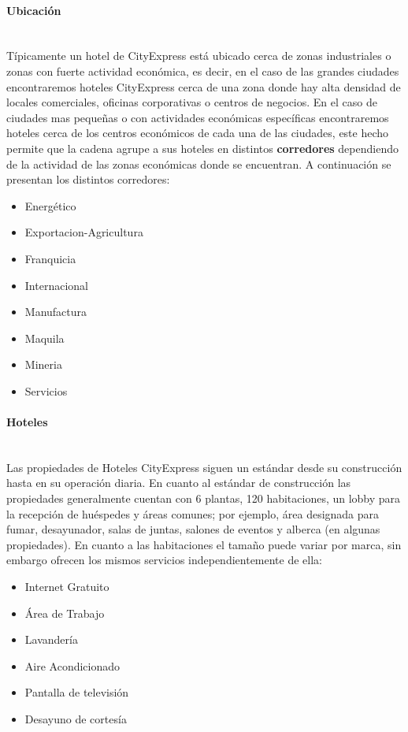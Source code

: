 \documentclass{article}\usepackage[]{graphicx}\usepackage[]{color}
\begin{document}
\paragraph {Ubicación} ~ \\
Típicamente un hotel de CityExpress está ubicado cerca de zonas industriales o zonas con fuerte actividad económica, es decir, en el caso de las grandes ciudades encontraremos hoteles CityExpress cerca de una zona donde hay alta densidad de locales comerciales, oficinas corporativas o centros de negocios. En el caso de ciudades mas pequeñas o con actividades económicas específicas encontraremos hoteles cerca de los centros económicos de cada una de las ciudades, este hecho permite que la cadena agrupe a sus hoteles en distintos \textbf{corredores} dependiendo de la actividad de las zonas económicas donde se encuentran. A continuación se presentan los distintos corredores:
\begin{itemize}[noitemsep]
\item Energético
\item Exportacion-Agricultura
\item Franquicia
\item Internacional
\item Manufactura
\item Maquila
\item Mineria
\item Servicios
\end{itemize}
\paragraph {Hoteles} ~ \\
Las propiedades de Hoteles CityExpress siguen un estándar desde su construcción hasta en su operación diaria. En cuanto al estándar de construcción las propiedades generalmente cuentan con 6 plantas, 120 habitaciones, un lobby para la recepción de huéspedes y áreas comunes; por ejemplo, área designada para fumar, desayunador, salas de juntas, salones de eventos y alberca (en algunas propiedades). 
En cuanto a las habitaciones el tamaño puede variar por marca, sin embargo ofrecen los mismos servicios independientemente de ella: 
\begin{itemize}[noitemsep]
\item Internet Gratuito
\item Área de Trabajo
\item Lavandería
\item Aire Acondicionado
\item Pantalla de televisión
\item Desayuno de cortesía
\end{itemize}
\end{document}
